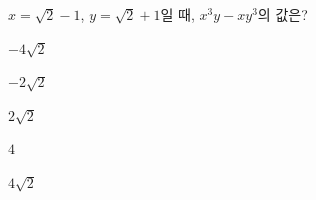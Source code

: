 $x=\sqrt{2}-1$, $y=\sqrt{2}+1$일 때, $x^3y-xy^3$의 값은?
\begin{choices32}{\rule[-3ex]{0pt}{8ex}$-4\sqrt{2}$}{\rule[-3ex]{0pt}{8ex}$-2\sqrt{2}$}{\rule[-3ex]{0pt}{8ex}$2\sqrt{2}$}{\rule[-3ex]{0pt}{8ex}$4$}{\rule[-3ex]{0pt}{8ex}$4\sqrt{2}$}\end{choices32}
